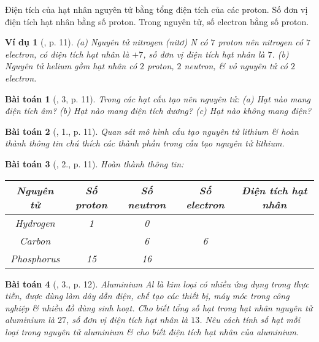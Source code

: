 \documentclass{article}
\newtheorem{baitoan}{Bài toán}
\newtheorem{vidu}{Ví dụ}
\begin{document}
Điện tích của hạt nhân nguyên tử bằng tổng điện tích của các proton. Số đơn vị điện tích hạt nhân bằng số proton. Trong nguyên tử, số electron bằng số proton.

\begin{vidu}[\cite{SGK_KHTN_7_Canh_Dieu}, p. 11]
	(a) Nguyên tử nitrogen (nitơ) \emph{N} có $7$ proton nên nitrogen có $7$ electron, có điện tích hạt nhân là $+7$, số đơn vị điện tích hạt nhân là $7$. (b) Nguyên tử helium gồm hạt nhân có $2$ proton, $2$ neutron, \& vỏ nguyên tử có $2$ electron.
\end{vidu}

\begin{baitoan}[\cite{SGK_KHTN_7_Canh_Dieu}, 3, p. 11]
	Trong các hạt cấu tạo nên nguyên tử: (a) Hạt nào mang điện tích âm? (b) Hạt nào mang điện tích dương? (c) Hạt nào không mang điện?
\end{baitoan}

\begin{baitoan}[\cite{SGK_KHTN_7_Canh_Dieu}, 1., p. 11]
	Quan sát mô hình cấu tạo nguyên tử lithium \& hoàn thành thông tin chú thích các thành phần trong cấu tạo nguyên tử lithium.
\end{baitoan}
	
\begin{baitoan}[\cite{SGK_KHTN_7_Canh_Dieu}, 2., p. 11]
	Hoàn thành thông tin:
	\begin{table}[H]
		\centering
		\begin{tabular}{|c|c|c|c|c|}
			\hline
			\textbf{Nguyên tử} & \textbf{Số proton} & \textbf{Số neutron} & \textbf{Số electron} & \textbf{Điện tích hạt nhân} \\
			\hline
			Hydrogen & 1 & 0 &  &  \\
			\hline
			Carbon &  & 6 & 6 &  \\
			\hline
			Phosphorus & 15 & 16 &  &  \\
			\hline
		\end{tabular}
	\end{table}
\end{baitoan}

\begin{baitoan}[\cite{SGK_KHTN_7_Canh_Dieu}, 3., p. 12]
	Aluminium \emph{Al} là kim loại có nhiều ứng dụng trong thực tiễn, được dùng làm dây dẫn điện, chế tạo các thiết bị, máy móc trong công nghiệp \& nhiều đồ dùng sinh hoạt. Cho biết tổng số hạt trong hạt nhân nguyên tử aluminium là $27$, số đơn vị điện tích hạt nhân là $13$. Nêu cách tính số hạt mỗi loại trong nguyên tử aluminium \& cho biết điện tích hạt nhân của aluminium.
\end{baitoan}
\end{document}
